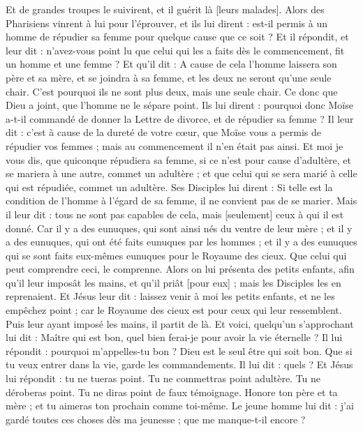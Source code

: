 \begin{multicols}{2}
Et de grandes troupes le suivirent, et il guérit là [leurs malades].
Alors des Pharisiens vinrent à lui pour l'éprouver, et ils lui dirent : est-il permis à un homme de répudier sa femme pour quelque cause que ce soit ?
Et il répondit, et leur dit : n'avez-vous point lu que celui qui les a faits dès le commencement, fit un homme et une femme ?
Et qu'il dit : A cause de cela l'homme laissera son père et sa mère, et se joindra à sa femme, et les deux ne seront qu'une seule chair.
C'est pourquoi ils ne sont plus deux, mais une seule chair. Ce donc que Dieu a joint, que l'homme ne le sépare point.
Ils lui dirent : pourquoi donc Moïse a-t-il commandé de donner la Lettre de divorce, et de répudier sa femme ?
Il leur dit : c'est à cause de la dureté de votre cœur, que Moïse vous a permis de répudier vos femmes ; mais au commencement il n'en était pas ainsi.
Et moi je vous dis, que quiconque répudiera sa femme, si ce n'est pour cause d'adultère, et se mariera à une autre, commet un adultère ; et que celui qui se sera marié à celle qui est répudiée, commet un adultère.
Ses Disciples lui dirent : Si telle est la condition de l'homme à l'égard de sa femme, il ne convient pas de se marier.
Mais il leur dit : tous ne sont pas capables de cela, mais [seulement] ceux à qui il est donné.
Car il y a des eunuques, qui sont ainsi nés du ventre de leur mère ; et il y a des eunuques, qui ont été faits eunuques par les hommes ; et il y a des eunuques qui se sont faits eux-mêmes eunuques pour le Royaume des cieux. Que celui qui peut comprendre ceci, le comprenne.
Alors on lui présenta des petits enfants, afin qu'il leur imposât les mains, et qu'il priât [pour eux] ; mais les Disciples les en reprenaient.
Et Jésus leur dit : laissez venir à moi les petits enfants, et ne les empêchez point ; car le Royaume des cieux est pour ceux qui leur ressemblent.
Puis leur ayant imposé les mains, il partit de là.
Et voici, quelqu'un s'approchant lui dit : Maître qui est bon, quel bien ferai-je pour avoir la vie éternelle ?
Il lui répondit : pourquoi m'appelles-tu bon ? Dieu est le seul être qui soit bon. Que si tu veux entrer dans la vie, garde les commandements.
Il lui dit : quels ? Et Jésus lui répondit : tu ne tueras point. Tu ne commettras point adultère. Tu ne déroberas point. Tu ne diras point de faux témoignage.
Honore ton père et ta mère ; et tu aimeras ton prochain comme toi-même.
Le jeune homme lui dit : j'ai gardé toutes ces choses dès ma jeunesse ; que me manque-t-il encore ?

\end{multicols}
